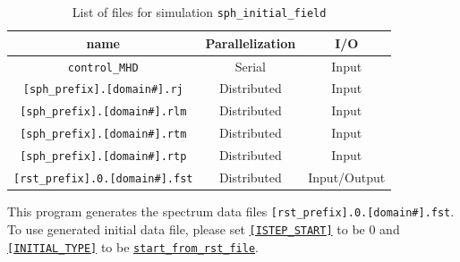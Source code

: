 \begin{table}[htp]
\caption{List of files for simulation {\tt sph\_initial\_field} }
\begin{center} 
\begin{tabular}{|c|c|c|}
\hline
 name & Parallelization & I/O \\ \hline \hline
\verb|control_MHD| & Serial & Input \\ \hline
\verb|[sph_prefix].[domain#].rj|  & Distributed & Input \\
\verb|[sph_prefix].[domain#].rlm| & Distributed & Input \\
\verb|[sph_prefix].[domain#].rtm| & Distributed & Input \\
\verb|[sph_prefix].[domain#].rtp| & Distributed & Input \\ \hline
\verb|[rst_prefix].0.[domain#].fst| &  Distributed & Input/Output  \\ \hline
\end{tabular}
\end{center}
\label{table:inital_fld}
\end{table}
%
This program generates the spectrum data files \verb|[rst_prefix].0.[domain#].fst|. To use generated initial data file, please set 
 \hyperref[href_t:i_step_init_ctl]{{\tt [ISTEP\_START]}} to be 0 and \hyperref[href_t:restart_file_ctl]{{\tt [INITIAL\_TYPE]}} to be \hyperref[href_t:restart_file_ctl]{{\tt start\_from\_rst\_file}}.


